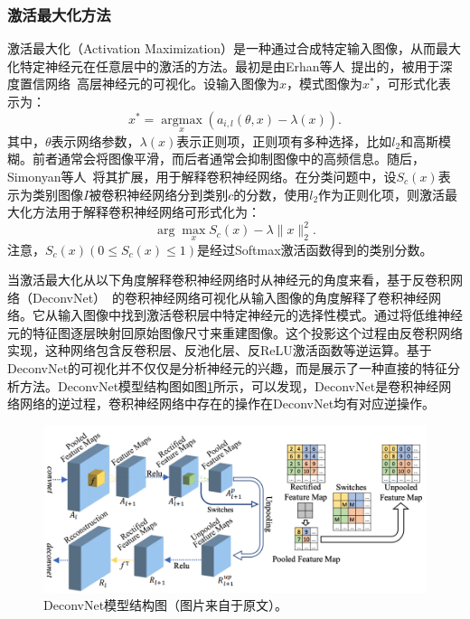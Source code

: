\subsubsection{激活最大化方法}
激活最大化（Activation Maximization）是一种通过合成特定输入图像，从而最大化特定神经元在任意层中的激活的方法。最初是由Erhan等人~\cite{erhan2009visualizing}提出的，被用于深度置信网络~\cite{hinton2006fast}高层神经元的可视化。设输入图像为$x$，模式图像为$x^*$，可形式化表示为：
\begin{equation}
x^{*}=\underset{x}{\operatorname{argmax}}\left(a_{i, l}(\theta, x)-\lambda(x)\right).
\end{equation}
其中，$\theta$表示网络参数，$\lambda(x)$表示正则项，正则项有多种选择，比如$l_2$和高斯模糊。前者通常会将图像平滑，而后者通常会抑制图像中的高频信息。随后，Simonyan等人~\cite{simonyan2013deep}将其扩展，用于解释卷积神经网络。在分类问题中，设$S_{c}(x)$表示为类别图像$I$被卷积神经网络分到类别$c$的分数，使用$l_2$作为正则化项，则激活最大化方法用于解释卷积神经网络可形式化为：
\begin{equation}
\arg \max _{x} S_{c}(x)-\lambda\|x\|_{2}^{2}.
\end{equation}
注意，$S_{c}(x)(0\leq S_{c}(x) \leq 1)$是经过Softmax激活函数得到的类别分数。

当激活最大化从以下角度解释卷积神经网络时从神经元的角度来看，基于反卷积网络（DeconvNet）~\cite{zeiler2014visualizing, zeiler2010deconvolutional, zeiler2011adaptive}的卷积神经网络可视化从输入图像的角度解释了卷积神经网络。它从输入图像中找到激活卷积层中特定神经元的选择性模式。通过将低维神经元的特征图逐层映射回原始图像尺寸来重建图像。这个投影这个过程由反卷积网络实现，这种网络包含反卷积层、反池化层、反ReLU激活函数等逆运算。基于DeconvNet的可视化并不仅仅是分析神经元的兴趣，而是展示了一种直接的特征分析方法。DeconvNet模型结构图如图\ref{fig:deconvnet_architecture}所示，可以发现，DeconvNet是卷积神经网络网络的逆过程，卷积神经网络中存在的操作在DeconvNet均有对应逆操作。
\begin{figure}[h]
	\centering
	\includegraphics[width=1.0\textwidth]{figure/deconvnet_architecture}
	\caption{DeconvNet模型结构图（图片来自于原文）。}
	\label{fig:deconvnet_architecture}
\end{figure}
